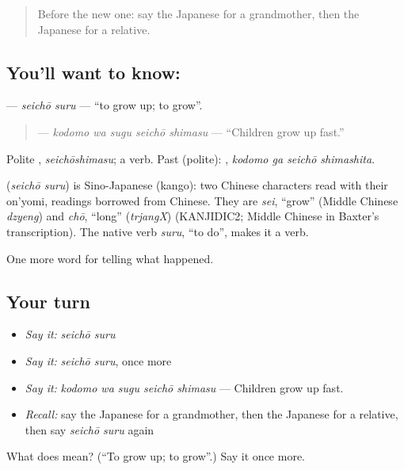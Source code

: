 \label{lesson:JA-C287-seichou-suru}



\begin{quote}
Before the new one: say the Japanese for a grandmother, then the Japanese for a relative.
\end{quote}

\subsection*{You'll want to know: }
\textbf{} — \emph{seichō suru} — \textquotedblleft{}to grow up; to grow\textquotedblright{}.

\begin{quote}
\textbf{  } — \emph{kodomo wa sugu seichō shimasu} — \textquotedblleft{}Children grow up fast.\textquotedblright{}
\end{quote}

Polite \textbf{}, \emph{seichōshimasu}; a  verb. Past (polite): \textbf{ }, \emph{kodomo ga seichō shimashita}.

\begin{cousinweb}
\textbf{} (\emph{seichō suru}) is Sino-Japanese (kango): two Chinese characters read with their on'yomi, readings borrowed from Chinese. They are \emph{sei}, \textquotedblleft{}grow\textquotedblright{} (Middle Chinese \emph{dzyeng}) and \emph{chō}, \textquotedblleft{}long\textquotedblright{} (\emph{trjangX}) (KANJIDIC2; Middle Chinese in Baxter's transcription). The native verb \emph{suru}, \textquotedblleft{}to do\textquotedblright{}, makes it a verb.
\end{cousinweb}

\begin{grammarlens}[title={What you've built}]
One more word for telling what happened.
\end{grammarlens}

\subsection*{Your turn}
\begin{itemize}
\raggedright
  \item \emph{Say it:} \emph{seichō suru}
  \item \emph{Say it:} \emph{seichō suru}, once more
  \item \emph{Say it:} \emph{kodomo wa sugu seichō shimasu} — Children grow up fast.
  \item \emph{Recall:} say the Japanese for a grandmother, then the Japanese for a relative, then say \emph{seichō suru} again
\end{itemize}

\begin{tcolorbox}[breakable,colback=teal!4,colframe=teal!35!black,title={Before you move on}]
What does  mean? (\textquotedblleft{}To grow up; to grow\textquotedblright{}.) Say it once more.
\end{tcolorbox}
